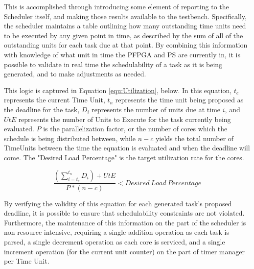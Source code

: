 This is accomplished through introducing some element of reporting to the Scheduler itself, and making those results available to the testbench. Specifically, the scheduler maintains a table outlining how many outstanding time units need to be executed by any given point in time, as described by the sum of all of the outstanding units for each task due at that point. By combining this information with knowledge of what unit in time the PFPGA and PS are currently in, it is possible to validate in real time the schedulability of a task as it is being generated, and to make adjustments as needed. 

This logic is captured in Equation \ref{equ:Utilization}, below. In this equation, $t_c$ represents the current Time Unit, $t_n$ represents the time unit being proposed as the deadline for the task, $D_i$ represents the number of units due at time $i$, and $UtE$ represents the number of Units to Execute for the task currently being evaluated. $P$ is the parallelization factor, or the number of cores which the schedule is being distributed between, while $n-c$ yields the total number of TimeUnits between the time the equation is evaluated and when the deadline will come. The "Desired Load Percentage" is the target utilization rate for the cores.

\begin{equation}\label{equ:Utilization}
    \frac{(\sum_{i=t_c}^{t_n}D_i)+UtE}{P*(n-c)} < Desired\:Load\:Percentage
\end{equation}

By verifying the validity of this equation for each generated task's proposed deadline, it is possible to ensure that schedulability constraints are not violated. Furthermore, the maintenance of this information on the part of the scheduler is non-resource intensive, requiring a single addition operation as each task is parsed, a single decrement operation as each core is serviced, and a single increment operation (for the current unit counter) on the part of timer manager per Time Unit.

